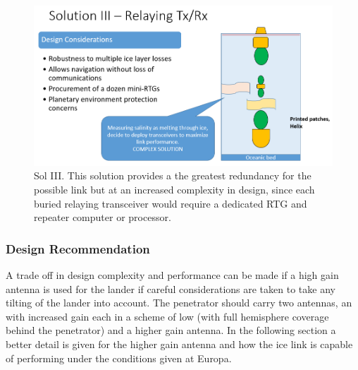 \begin{figure}[htb]
	\centering
	\includegraphics[width=\textwidth]{figures/comms/iceLink-relay}
	\caption{Sol III. This solution provides a the greatest redundancy for the possible link but at an increased complexity in design, since each buried relaying transceiver would require a dedicated RTG and repeater computer or processor.}
	\label{fig:iceLink-relay}
\end{figure}

\subsubsection{Design Recommendation}

A trade off in design complexity and performance can be made if a high gain antenna is used for the lander if careful considerations are taken to take any tilting of the lander into account. The penetrator should carry two antennas, an with increased gain each in a scheme of low (with full hemisphere coverage behind the penetrator) and a higher gain antenna. In the following section a better detail is given for the higher gain antenna and how the ice link is capable of performing under the conditions given at Europa.

